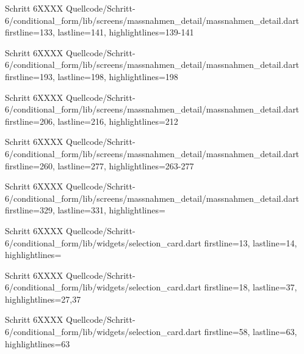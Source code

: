 


  \begin{alexlisting}{Schritt 6}{XXXX}
    {Quellcode/Schritt-6/conditional_form/lib/screens/massnahmen_detail/massnahmen_detail.dart}
    {firstline=133, lastline=141, highlightlines={139-141}}
    \label{lst:Schritt6XXXXX}
  \end{alexlisting}

  \begin{alexlisting}{Schritt 6}{XXXX}
    {Quellcode/Schritt-6/conditional_form/lib/screens/massnahmen_detail/massnahmen_detail.dart}
    {firstline=193, lastline=198, highlightlines={198}}
    \label{lst:Schritt6XXXXX}
  \end{alexlisting}

  \begin{alexlisting}{Schritt 6}{XXXX}
    {Quellcode/Schritt-6/conditional_form/lib/screens/massnahmen_detail/massnahmen_detail.dart}
    {firstline=206, lastline=216, highlightlines={212}}
    \label{lst:Schritt6XXXXX}
  \end{alexlisting}

  \begin{alexlisting}{Schritt 6}{XXXX}
    {Quellcode/Schritt-6/conditional_form/lib/screens/massnahmen_detail/massnahmen_detail.dart}
    {firstline=260, lastline=277, highlightlines={263-277}}
    \label{lst:Schritt6XXXXX}
  \end{alexlisting}

  \begin{alexlisting}{Schritt 6}{XXXX}
    {Quellcode/Schritt-6/conditional_form/lib/screens/massnahmen_detail/massnahmen_detail.dart}
    {firstline=329, lastline=331, highlightlines={}}
    \label{lst:Schritt6XXXXX}
  \end{alexlisting}


  \begin{alexlisting}{Schritt 6}{XXXX}
    {Quellcode/Schritt-6/conditional_form/lib/widgets/selection_card.dart}
    {firstline=13, lastline=14, highlightlines={}}
    \label{lst:Schritt6XXXX}
\end{alexlisting}

\begin{alexlisting}{Schritt 6}{XXXX}
    {Quellcode/Schritt-6/conditional_form/lib/widgets/selection_card.dart}
    {firstline=18, lastline=37, highlightlines={27,37}}
    \label{lst:Schritt6XXXX}
\end{alexlisting}

\begin{alexlisting}{Schritt 6}{XXXX}
    {Quellcode/Schritt-6/conditional_form/lib/widgets/selection_card.dart}
    {firstline=58, lastline=63, highlightlines={63}}
    \label{lst:Schritt6XXXX}
\end{alexlisting}


